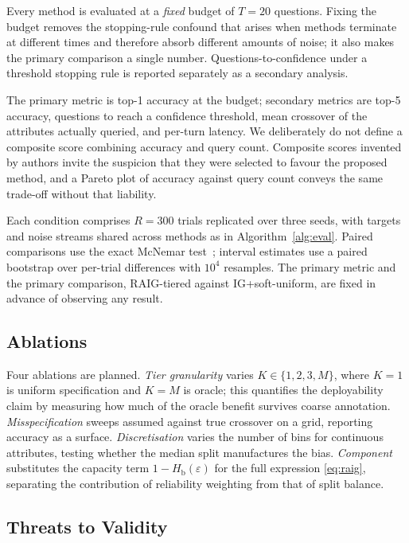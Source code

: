 \documentclass[conference]{IEEEtran}
\newcommand{\Hb}{H_{\mathrm{b}}}
\begin{document}
Every method is evaluated at a \emph{fixed} budget of $T=20$ questions. Fixing
the budget removes the stopping-rule confound that arises when methods
terminate at different times and therefore absorb different amounts of noise;
it also makes the primary comparison a single number. Questions-to-confidence
under a threshold stopping rule is reported separately as a secondary
analysis.

The primary metric is top-1 accuracy at the budget; secondary metrics are top-5
accuracy, questions to reach a confidence threshold, mean crossover of the
attributes actually queried, and per-turn latency. We deliberately do not
define a composite score combining accuracy and query count. Composite scores
invented by authors invite the suspicion that they were selected to favour the
proposed method, and a Pareto plot of accuracy against query count conveys the
same trade-off without that liability.

Each condition comprises $R=300$ trials replicated over three seeds, with
targets and noise streams shared across methods as in
Algorithm~\ref{alg:eval}. Paired comparisons use the exact McNemar
test~\cite{mcnemar1947}; interval estimates use a paired bootstrap over
per-trial differences with $10^4$ resamples. The primary metric and the primary
comparison, RAIG-tiered against IG+soft-uniform, are fixed in advance of
observing any result.

\subsection{Ablations}
\label{sec:ablation}

Four ablations are planned. \emph{Tier granularity} varies $K \in \{1,2,3,M\}$,
where $K=1$ is uniform specification and $K=M$ is oracle; this quantifies the
deployability claim by measuring how much of the oracle benefit survives coarse
annotation. \emph{Misspecification} sweeps assumed against true crossover on a
grid, reporting accuracy as a surface. \emph{Discretisation} varies the number
of bins for continuous attributes, testing whether the median split
manufactures the bias. \emph{Component} substitutes the capacity term
$1-\Hb(\varepsilon)$ for the full expression \eqref{eq:raig}, separating the
contribution of reliability weighting from that of split balance.

\subsection{Threats to Validity}
\end{document}
